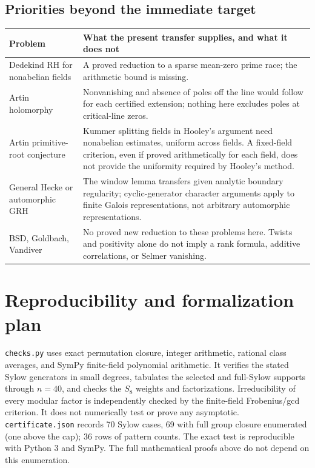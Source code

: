 \documentclass[11pt]{article}
\theoremstyle{remark}\newtheorem{remark}[theorem]{Remark}
\begin{document}
\subsection{Priorities beyond the immediate target}
\begin{center}
\begin{tabular}{p{.26\linewidth}p{.64\linewidth}}\toprule
Problem & What the present transfer supplies, and what it does not\\\midrule
Dedekind RH for nonabelian fields & A proved reduction to a sparse
mean-zero prime race; the arithmetic bound is missing.\\
Artin holomorphy & Nonvanishing and absence of poles off the line
would follow for each certified extension; nothing here excludes
poles at critical-line zeros.\\
Artin primitive-root conjecture & Kummer splitting fields in Hooley's
argument need nonabelian estimates, uniform across fields. A
fixed-field criterion, even if proved arithmetically for each field,
does not provide the uniformity required by Hooley's method.\\
General Hecke or automorphic GRH & The window lemma transfers given
analytic boundary regularity; cyclic-generator character arguments
apply to finite Galois representations, not arbitrary automorphic
representations.\\
BSD, Goldbach, Vandiver & No proved new reduction to these problems
here. Twists and positivity alone do not imply a rank formula,
additive correlations, or Selmer vanishing.\\\bottomrule
\end{tabular}
\end{center}

\section{Reproducibility and formalization plan}
\texttt{checks.py} uses exact permutation closure, integer arithmetic,
rational class averages, and SymPy finite-field polynomial arithmetic.
It verifies the stated Sylow generators in small degrees, tabulates
the selected and full-Sylow supports through $n=40$, and checks the
$S_8$ weights and factorizations. Irreducibility of every modular
factor is independently checked by the finite-field Frobenius/gcd
criterion. It does not numerically test or prove any asymptotic.
\texttt{certificate.json} records 70 Sylow cases, 69 with full group
closure enumerated (one above the cap); 36 rows of pattern counts.
The exact test is reproducible with Python 3 and SymPy. The full
mathematical proofs above do not depend on this enumeration.
\end{document}
